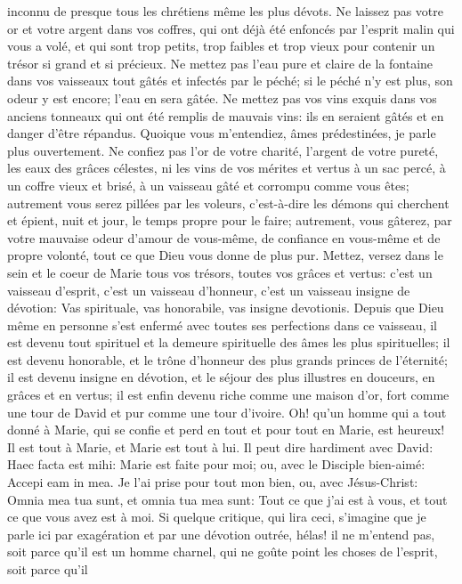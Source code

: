 inconnu de presque tous les chrétiens même les plus dévots.
Ne laissez pas votre or et votre argent dans vos coffres, qui ont déjà été enfoncés par l'esprit malin qui vous a
volé, et qui sont trop petits, trop faibles et trop vieux pour contenir un trésor si grand et si précieux. Ne mettez pas
l'eau pure et claire de la fontaine dans vos vaisseaux tout gâtés et infectés par le péché; si le péché n'y est plus,
son odeur y est encore; l'eau en sera gâtée. Ne mettez pas vos vins exquis dans vos anciens tonneaux qui ont été
remplis de mauvais vins: ils en seraient gâtés et en danger d'être répandus.
 Quoique vous m'entendiez, âmes prédestinées, je parle plus ouvertement. Ne confiez pas l'or de votre
charité, l'argent de votre pureté, les eaux des grâces célestes, ni les vins de vos mérites et vertus à un sac percé,
à un coffre vieux et brisé, à un vaisseau gâté et corrompu comme vous êtes; autrement vous serez pillées par les
voleurs, c'est-à-dire les démons qui cherchent et épient, nuit et jour, le temps propre pour le faire; autrement, vous
gâterez, par votre mauvaise odeur d'amour de vous-même, de confiance en vous-même et de propre volonté, tout
ce que Dieu vous donne de plus pur. Mettez, versez dans le sein et le coeur de Marie tous vos trésors, toutes vos
grâces et vertus: c'est un vaisseau d'esprit, c'est un vaisseau d'honneur, c'est un vaisseau insigne de dévotion:
Vas spirituale, vas honorabile, vas insigne devotionis. Depuis que Dieu même en personne s'est enfermé avec
toutes ses perfections dans ce vaisseau, il est devenu tout spirituel et la demeure spirituelle des âmes les plus
spirituelles; il est devenu honorable, et le trône d'honneur des plus grands princes de l'éternité; il est devenu
insigne en dévotion, et le séjour des plus illustres en douceurs, en grâces et en vertus; il est enfin devenu riche
comme une maison d'or, fort comme une tour de David et pur comme une tour d'ivoire.
 Oh! qu'un homme qui a tout donné à Marie, qui se confie et perd en tout et pour tout en Marie, est heureux! Il
est tout à Marie, et Marie est tout à lui. Il peut dire hardiment avec David: Haec facta est mihi: Marie est faite pour
moi; ou, avec le Disciple bien-aimé: Accepi eam in mea. Je l'ai prise pour tout mon bien, ou, avec Jésus-Christ:
Omnia mea tua sunt, et omnia tua mea sunt: Tout ce que j'ai est à vous, et tout ce que vous avez est à moi.
 Si quelque critique, qui lira ceci, s'imagine que je parle ici par exagération et par une dévotion outrée, hélas! il
ne m'entend pas, soit parce qu'il est un homme charnel, qui ne goûte point les choses de l'esprit, soit parce qu'il
